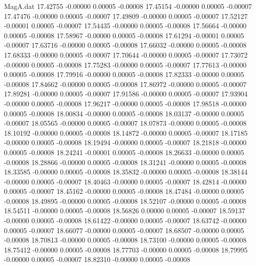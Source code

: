 \begin{filecontents}{MagA.dat}
  17.42755   -0.00000    0.00005   -0.00008
  17.45154   -0.00000    0.00005   -0.00007
  17.47476   -0.00000    0.00005   -0.00007
  17.49809   -0.00000    0.00005   -0.00007
  17.52127   -0.00001    0.00005   -0.00007
  17.54435   -0.00000    0.00005   -0.00008
  17.56664   -0.00000    0.00005   -0.00008
  17.58967   -0.00000    0.00005   -0.00008
  17.61294   -0.00001    0.00005   -0.00007
  17.63716   -0.00000    0.00005   -0.00008
  17.66032   -0.00000    0.00005   -0.00008
  17.68333   -0.00000    0.00005   -0.00007
  17.70644   -0.00000    0.00005   -0.00007
  17.73072   -0.00000    0.00005   -0.00008
  17.75283   -0.00000    0.00005   -0.00007
  17.77613   -0.00000    0.00005   -0.00008
  17.79916   -0.00000    0.00005   -0.00008
  17.82333   -0.00000    0.00005   -0.00008
  17.84662   -0.00000    0.00005   -0.00008
  17.86972   -0.00000    0.00005   -0.00007
  17.89281   -0.00000    0.00005   -0.00007
  17.91586   -0.00000    0.00005   -0.00007
  17.93904   -0.00000    0.00005   -0.00008
  17.96217   -0.00000    0.00005   -0.00008
  17.98518   -0.00000    0.00005   -0.00008
  18.00834   -0.00000    0.00005   -0.00008
  18.03137   -0.00000    0.00005   -0.00007
  18.05565   -0.00000    0.00005   -0.00007
  18.07873   -0.00000    0.00005   -0.00008
  18.10192   -0.00000    0.00005   -0.00008
  18.14872   -0.00000    0.00005   -0.00007
  18.17185   -0.00000    0.00005   -0.00008
  18.19494   -0.00000    0.00005   -0.00007
  18.21818   -0.00000    0.00005   -0.00008
  18.24241   -0.00001    0.00005   -0.00008
  18.26633   -0.00000    0.00005   -0.00008
  18.28866   -0.00000    0.00005   -0.00008
  18.31241   -0.00000    0.00005   -0.00008
  18.33585   -0.00000    0.00005   -0.00008
  18.35832   -0.00000    0.00005   -0.00008
  18.38144   -0.00000    0.00005   -0.00007
  18.40463   -0.00000    0.00005   -0.00007
  18.42814   -0.00000    0.00005   -0.00007
  18.45162   -0.00000    0.00005   -0.00008
  18.47484   -0.00000    0.00005   -0.00008
  18.49895   -0.00000    0.00005   -0.00008
  18.52107   -0.00000    0.00005   -0.00008
  18.54511   -0.00000    0.00005   -0.00008
  18.56826    0.00000    0.00005   -0.00007
  18.59137   -0.00000    0.00005   -0.00008
  18.61422   -0.00000    0.00005   -0.00007
  18.63742   -0.00000    0.00005   -0.00007
  18.66077   -0.00000    0.00005   -0.00007
  18.68507   -0.00000    0.00005   -0.00008
  18.70813   -0.00000    0.00005   -0.00008
  18.73100   -0.00000    0.00005   -0.00008
  18.75412   -0.00000    0.00005   -0.00008
  18.77703   -0.00000    0.00005   -0.00008
  18.79995   -0.00000    0.00005   -0.00007
  18.82310   -0.00000    0.00005   -0.00008

\end{filecontents}
